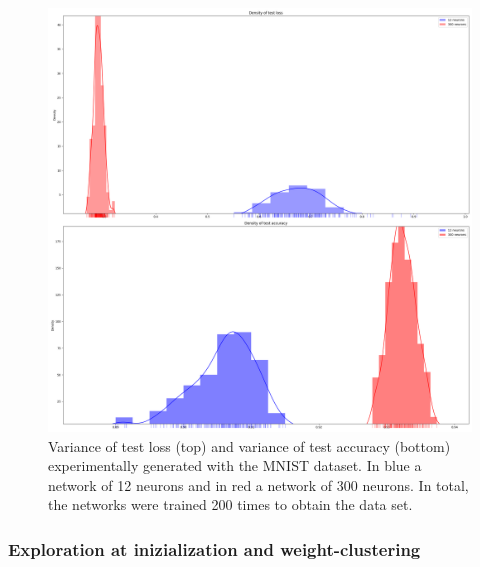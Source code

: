 \begin{figure}[!htp]
\centering
\includegraphics[scale=0.3]{Abschlussarbeit_2021/LaTeX/images/varianz_test.png}
\caption{Variance of test loss (top) and variance of test accuracy (bottom) experimentally generated with the MNIST dataset. In blue a network of 12 neurons and in red a network of 300 neurons.
In total, the networks were trained 200 times to obtain the data set.}
\label{varianz_mnsit}
\end{figure}

\newpage






\subsubsection{Exploration at inizialization and weight-clustering}
\label{weight-cluster}

